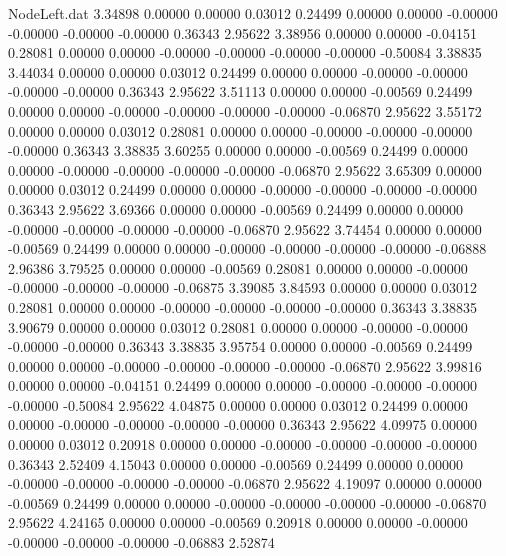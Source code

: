 \begin{filecontents}{NodeLeft.dat}
   3.34898    0.00000    0.00000     0.03012    0.24499    0.00000    0.00000   -0.00000   -0.00000   -0.00000   -0.00000    0.36343    2.95622
   3.38956    0.00000    0.00000    -0.04151    0.28081    0.00000    0.00000   -0.00000   -0.00000   -0.00000   -0.00000   -0.50084    3.38835
   3.44034    0.00000    0.00000     0.03012    0.24499    0.00000    0.00000   -0.00000   -0.00000   -0.00000   -0.00000    0.36343    2.95622
   3.51113    0.00000    0.00000    -0.00569    0.24499    0.00000    0.00000   -0.00000   -0.00000   -0.00000   -0.00000   -0.06870    2.95622
   3.55172    0.00000    0.00000     0.03012    0.28081    0.00000    0.00000   -0.00000   -0.00000   -0.00000   -0.00000    0.36343    3.38835
   3.60255    0.00000    0.00000    -0.00569    0.24499    0.00000    0.00000   -0.00000   -0.00000   -0.00000   -0.00000   -0.06870    2.95622
   3.65309    0.00000    0.00000     0.03012    0.24499    0.00000    0.00000   -0.00000   -0.00000   -0.00000   -0.00000    0.36343    2.95622
   3.69366    0.00000    0.00000    -0.00569    0.24499    0.00000    0.00000   -0.00000   -0.00000   -0.00000   -0.00000   -0.06870    2.95622
   3.74454    0.00000    0.00000    -0.00569    0.24499    0.00000    0.00000   -0.00000   -0.00000   -0.00000   -0.00000   -0.06888    2.96386
   3.79525    0.00000    0.00000    -0.00569    0.28081    0.00000    0.00000   -0.00000   -0.00000   -0.00000   -0.00000   -0.06875    3.39085
   3.84593    0.00000    0.00000     0.03012    0.28081    0.00000    0.00000   -0.00000   -0.00000   -0.00000   -0.00000    0.36343    3.38835
   3.90679    0.00000    0.00000     0.03012    0.28081    0.00000    0.00000   -0.00000   -0.00000   -0.00000   -0.00000    0.36343    3.38835
   3.95754    0.00000    0.00000    -0.00569    0.24499    0.00000    0.00000   -0.00000   -0.00000   -0.00000   -0.00000   -0.06870    2.95622
   3.99816    0.00000    0.00000    -0.04151    0.24499    0.00000    0.00000   -0.00000   -0.00000   -0.00000   -0.00000   -0.50084    2.95622
   4.04875    0.00000    0.00000     0.03012    0.24499    0.00000    0.00000   -0.00000   -0.00000   -0.00000   -0.00000    0.36343    2.95622
   4.09975    0.00000    0.00000     0.03012    0.20918    0.00000    0.00000   -0.00000   -0.00000   -0.00000   -0.00000    0.36343    2.52409
   4.15043    0.00000    0.00000    -0.00569    0.24499    0.00000    0.00000   -0.00000   -0.00000   -0.00000   -0.00000   -0.06870    2.95622
   4.19097    0.00000    0.00000    -0.00569    0.24499    0.00000    0.00000   -0.00000   -0.00000   -0.00000   -0.00000   -0.06870    2.95622
   4.24165    0.00000    0.00000    -0.00569    0.20918    0.00000    0.00000   -0.00000   -0.00000   -0.00000   -0.00000   -0.06883    2.52874

\end{filecontents}
